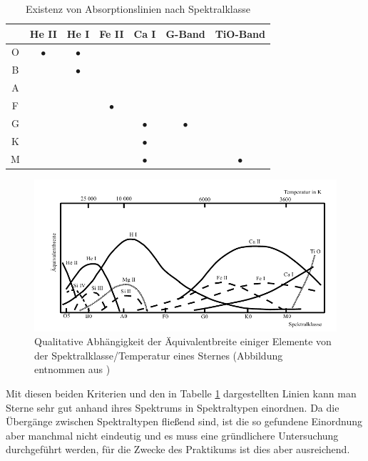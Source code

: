 \begin{table}
\centering
\begin{tabular}{c|c|c|c|c|c|c}

 & He II & He I & Fe II & Ca I & G-Band & TiO-Band \\ 
\hline 
O & $\bullet$ & $\bullet$ &  &  &  &  \\ 
\hline 
B &  & $\bullet$ &  &  &  &  \\ 
\hline 
A &  &  &  &  &  &  \\ 
\hline 
F &  &  & $\bullet$ &  &  & \\ 
\hline
G &  &  &  & $\bullet$ & $\bullet$ &  \\ 
\hline 
K &  &  &  & $\bullet$ &  &  \\ 
\hline 
M &  &  &  & $\bullet$ &  & $\bullet$ \\ 
\end{tabular}
\caption{Existenz von Absorptionslinien nach Spektralklasse}
\label{tab:Spektralklassen}
\end{table}

\begin{figure}
\includegraphics[width=1\textwidth]{images/Spektralklassen.png}
\caption{Qualitative Abhängigkeit der Äquivalentbreite einiger Elemente von der Spektralklasse/Temperatur eines Sternes (Abbildung entnommen aus \cite{ronomischesPraktikum})}
\label{fig:Harvard}
\end{figure}

Mit diesen beiden Kriterien und den in Tabelle \ref{tab:Spektralklassen} dargestellten Linien kann man Sterne sehr gut anhand ihres Spektrums in Spektraltypen einordnen. Da die Übergänge zwischen Spektraltypen fließend sind, ist die so gefundene Einordnung aber manchmal nicht eindeutig und es muss eine gründlichere Untersuchung durchgeführt werden, für die Zwecke des Praktikums ist dies aber ausreichend.

